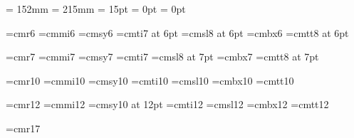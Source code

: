 




\hsize     = 152mm
\vsize     = 215mm
\topskip   =  15pt
  \parskip   =   0pt
  \parindent =   0pt


%



\font\sixrm=cmr6
\font\sixi=cmmi6
\font\sixsy=cmsy6
\font\sixit=cmti7 at 6pt
\font\sixsl=cmsl8 at 6pt
\font\sixbf=cmbx6
\font\sixtt=cmtt8 at 6pt

\font\sevenrm=cmr7
\font\seveni=cmmi7
\font\sevensy=cmsy7
\font\sevenit=cmti7
\font\sevensl=cmsl8 at 7pt
\font\sevenbf=cmbx7
\font\seventt=cmtt8 at 7pt

\font\tenrm=cmr10
\font\teni=cmmi10
\font\tensy=cmsy10
\font\tenit=cmti10
\font\tensl=cmsl10
\font\tenbf=cmbx10
\font\tentt=cmtt10

\font\twelverm=cmr12
\font\twelvei=cmmi12
\font\twelvesy=cmsy10 at 12pt
\font\twelveit=cmti12
\font\twelvesl=cmsl12
\font\twelvebf=cmbx12
\font\twelvett=cmtt12

\def\twelvepoint{%
\def\rm{\fam0\twelverm}%
\def\it{\fam\itfam\twelveit}%
\def\sl{\fam\slfam\twelvesl}%
\def\bf{\fam\bffam\twelvebf}%
\def\tt{\fam\ttfam\twelvett}%
\def\cal{\twelvesy}%
 \textfont0=\twelverm
  \scriptfont0=\sevenrm
  \scriptscriptfont0=\sixrm
 \textfont1=\twelvei
  \scriptfont1=\seveni
  \scriptscriptfont1=\sixi
 \textfont2=\twelvesy
  \scriptfont2=\sevensy
  \scriptscriptfont2=\sixsy
 \textfont3=\tenex
  \scriptfont3=\tenex
  \scriptscriptfont3=\tenex
 \textfont\itfam=\twelveit
 \textfont\slfam=\twelvesl
 \textfont\bffam=\twelvebf
 \textfont\ttfam=\twelvett
 \baselineskip=15pt
}


 \font\sixteenrm=cmr17

